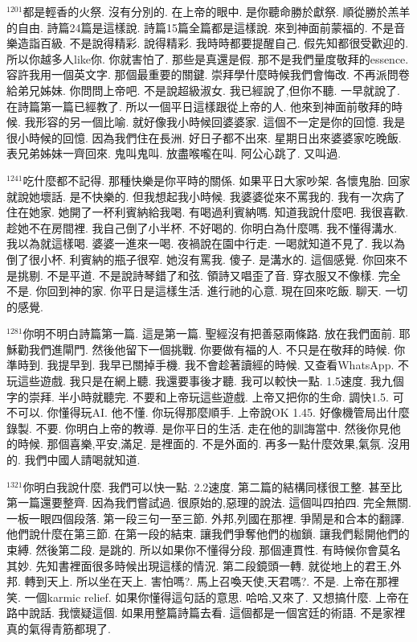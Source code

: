 \documentclass{book}
\begin{document}
$^{1201}$都是輕香的火祭.
沒有分別的.
在上帝的眼中.
是你聽命勝於獻祭.
順從勝於羔羊的自由.
詩篇24篇是這樣說.
詩篇15篇全篇都是這樣說.
來到神面前蒙福的.
不是音樂造詣百級.
不是說得精彩.
說得精彩.
我時時都要提醒自己.
假先知都很受歡迎的.
所以你越多人like你.
你就害怕了.
那些是真還是假.
那不是我們量度敬拜的essence.
容許我用一個英文字.
那個最重要的關鍵.
崇拜學什麼時候我們會悔改.
不再派問卷給弟兄姊妹.
你問問上帝吧.
不是說超級淑女.
我已經說了,但你不聽.
一早就說了.
在詩篇第一篇已經教了.
所以一個平日這樣跟從上帝的人.
他來到神面前敬拜的時候.
我形容的另一個比喻.
就好像我小時候回婆婆家.
這個不一定是你的回憶.
我是很小時候的回憶.
因為我們住在長洲.
好日子都不出來.
星期日出來婆婆家吃晚飯.
表兄弟姊妹一齊回來.
鬼叫鬼叫.
放盡喉嚨在叫.
阿公心跳了.
又叫過.

$^{1241}$吃什麼都不記得.
那種快樂是你平時的關係.
如果平日大家吵架.
各懷鬼胎.
回家就說她壞話.
是不快樂的.
但我想起我小時候.
我婆婆從來不罵我的.
我有一次病了住在她家.
她開了一杯利賓納給我喝.
有喝過利賓納嗎.
知道我說什麼吧.
我很喜歡.
趁她不在房間裡.
我自己倒了小半杯.
不好喝的.
你明白為什麼嗎.
我不懂得溝水.
我以為就這樣喝.
婆婆一進來一喝.
夜禍說在園中行走.
一喝就知道不見了.
我以為倒了很小杯.
利賓納的瓶子很窄.
她沒有罵我.
傻子.
是溝水的.
這個感覺.
你回來不是挑剔.
不是平道.
不是說詩琴錯了和弦.
領詩又唱歪了音.
穿衣服又不像樣.
完全不是.
你回到神的家.
你平日是這樣生活.
進行祂的心意.
現在回來吃飯.
聊天.
一切的感覺.

$^{1281}$你明不明白詩篇第一篇.
這是第一篇.
聖經沒有把善惡兩條路.
放在我們面前.
耶穌勸我們進閘門.
然後他留下一個挑戰.
你要做有福的人.
不只是在敬拜的時候.
你準時到.
我提早到.
我早已關掉手機.
我不會趁著讀經的時候.
又查看WhatsApp.
不玩這些遊戲.
我只是在網上聽.
我還要事後才聽.
我可以較快一點.
1.5速度.
我九個字的崇拜.
半小時就聽完.
不要和上帝玩這些遊戲.
上帝又把你的生命.
調快1.5.
可不可以.
你懂得玩AI.
他不懂.
你玩得那麼順手.
上帝說OK 1.45.
好像機管局出什麼錄製.
不要.
你明白上帝的教導.
是你平日的生活.
走在他的訓誨當中.
然後你見他的時候.
那個喜樂,平安,滿足.
是裡面的.
不是外面的.
再多一點什麼效果,氣氛.
沒用的.
我們中國人請喝就知道.

$^{1321}$你明白我說什麼.
我們可以快一點.
2.2速度.
第二篇的結構同樣很工整.
甚至比第一篇還要整齊.
因為我們嘗試過.
很原始的,惡理的說法.
這個叫四拍四.
完全無關.
一板一眼四個段落.
第一段三句一至三節.
外邦,列國在那裡.
爭鬧是和合本的翻譯.
他們說什麼在第三節.
在第一段的結束.
讓我們爭奪他們的枷鎖.
讓我們鬆開他們的束縛.
然後第二段.
是跳的.
所以如果你不懂得分段.
那個連貫性.
有時候你會莫名其妙.
先知書裡面很多時候出現這樣的情況.
第二段鏡頭一轉.
就從地上的君王,外邦.
轉到天上.
所以坐在天上.
害怕嗎?.
馬上召喚天使,天君嗎?.
不是.
上帝在那裡笑.
一個karmic relief.
如果你懂得這句話的意思.
哈哈,又來了.
又想搞什麼.
上帝在路中說話.
我懷疑這個.
如果用整篇詩篇去看.
這個都是一個宮廷的術語.
不是家裡真的氣得青筋都現了.
\end{document}
